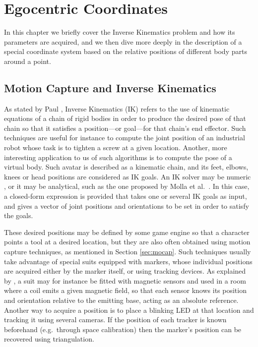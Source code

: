 
\chapter{Egocentric Coordinates}

\label{Chapter2}

In this chapter we briefly cover the Inverse Kinematics problem and how its parameters are acquired, and we then dive more deeply in the description of a special coordinate system based on the relative positions of different body parts around a point.

\section{Motion Capture and Inverse Kinematics}

As stated by Paul \cite{paul1981robot}, Inverse Kinematics (IK) refers to the use of kinematic equations of a chain of rigid bodies in order to produce the desired pose of that chain so that it satisfies a position---or goal---for that chain's end effector. Such techniques are useful for instance to compute the joint position of an industrial robot whose task is to tighten a screw at a given location. Another, more interesting application to us of such algorithms is to compute the pose of a virtual body. Such avatar is described as a kinematic chain, and its feet, elbows, knees or head positions are considered as IK goals. An IK solver may be numeric \cite{goldenberg1985complete,manocha1994efficient}, or it may be analytical, such as the one proposed by Molla et al.\ \cite{molla2013singularity}. In this case, a closed-form expression is provided that takes one or several IK goals as input, and gives a vector of joint positions and orientations to be set in order to satisfy the goals.

These desired positions may be defined by some game engine so that a character points a tool at a desired location, but they are also often obtained using motion capture techniques, as mentioned in Section \ref{sec:mocap}. Such techniques usually take advantage of special suits equipped with markers, whose individual positions are acquired either by the marker itself, or using tracking devices. As explained by \cite{west1995motion}, a suit may for instance be fitted with magnetic sensors and used in a room where a coil emits a given magnetic field, so that each sensor knows its position and orientation relative to the emitting base, acting as an absolute reference. Another way to acquire a position is to place a blinking LED at that location and tracking it using several cameras. If the position of each tracker is known beforehand (e.g.\ through space calibration) then the marker's position can be recovered using triangulation.

